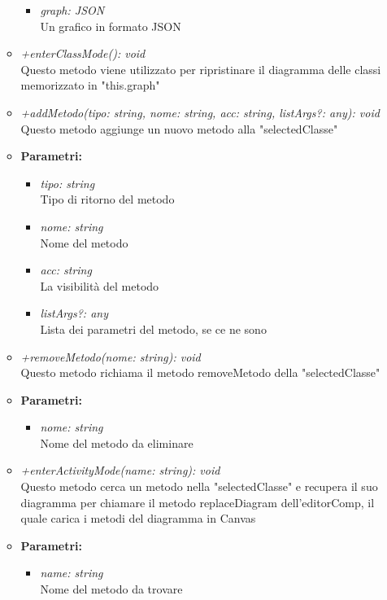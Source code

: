 \begin{itemize}
\begin{itemize}
\begin{itemize}
            					\item \emph{graph: JSON}\\
            					Un grafico in formato JSON
            				\end{itemize}
            			\item \emph{+enterClassMode(): void}\\
          				Questo metodo viene utilizzato per ripristinare il diagramma delle classi memorizzato in "this.graph"
          				\item \emph{+addMetodo(tipo: string, nome: string, acc: string, listArgs?: any): void}\\
          				Questo metodo aggiunge un nuovo metodo alla "selectedClasse"
          				\item \textbf{Parametri:}\\
            				\begin{itemize}
            					\item \emph{tipo: string}\\
            					Tipo di ritorno del metodo
            					\item \emph{nome: string}\\
            					Nome del metodo
            					\item \emph{acc: string}\\
            					La visibilità del metodo
            					\item \emph{listArgs?: any}\\
            					Lista dei parametri del metodo, se ce ne sono
            				\end{itemize}
            			\item \emph{+removeMetodo(nome: string): void}\\
          				Questo metodo richiama il metodo removeMetodo della "selectedClasse"
          				\item \textbf{Parametri:}\\
            				\begin{itemize}
            					\item \emph{nome: string}\\
            					Nome del metodo da eliminare
            				\end{itemize}
            			\item \emph{+enterActivityMode(name: string): void}\\
          				Questo metodo cerca un metodo nella "selectedClasse" e recupera il suo diagramma per chiamare il metodo replaceDiagram dell'editorComp, il quale carica i metodi del diagramma in Canvas
          				\item \textbf{Parametri:}\\
            				\begin{itemize}
            					\item \emph{name: string}\\
            					Nome del metodo da trovare
            				\end{itemize}
          			\end{itemize}
          		\end{itemize}
